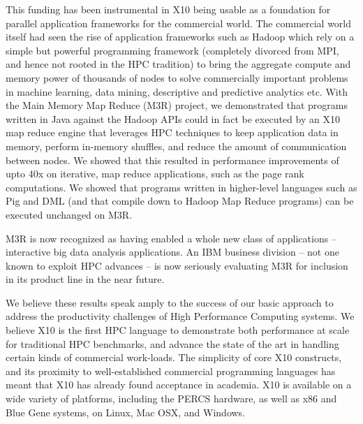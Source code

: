 This funding has been instrumental in X10 being usable as a foundation
for parallel application frameworks for the commercial world. The
commercial world itself had seen the rise of application frameworks
such as Hadoop which rely on a simple but powerful programming
framework (completely divorced from MPI, and hence not rooted in the
HPC tradition) to bring the aggregate compute and memory power of
thousands of nodes to solve commercially important problems in machine
learning, data mining, descriptive and predictive analytics etc. With
the Main Memory Map Reduce (M3R) project, we demonstrated that
programs written in Java against the Hadoop APIs could in fact be
executed by an X10 map reduce engine that leverages HPC techniques to
keep application data in memory, perform in-memory shuffles, and
reduce the amount of communication between nodes. We showed that this
resulted in performance improvements of upto 40x on iterative, map
reduce applications, such as the page rank computations. We showed
that programs written in higher-level languages such as Pig and DML
(and that compile down to Hadoop Map Reduce programs) can be executed
unchanged on M3R.  

M3R is now recognized as having enabled a whole new class of
applications -- interactive big data analysis applications. An IBM
business division -- not one known to exploit HPC advances -- is now
seriously evaluating M3R for inclusion in its product line in the near
future.  

We believe these results speak amply to the success of our basic
approach to address the productivity challenges of High Performance
Computing systems. We believe X10 is the first HPC language to
demonstrate both performance at scale for traditional HPC benchmarks,
and advance the state of the art in handling certain kinds of
commercial work-loads. The simplicity of core X10 constructs, and its
proximity to well-established commercial programming languages has
meant that X10 has already found acceptance in academia. X10 is
available on a wide variety of platforms, including the PERCS
hardware, as well as x86 and Blue Gene systems, on Linux, Mac OSX, and
Windows.  
